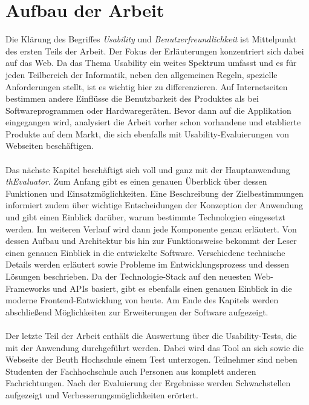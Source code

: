 %
%
%
%

\section{Aufbau der Arbeit}

Die Klärung des Begriffes \textit{Usability} und \textit{Benutzerfreundlichkeit} ist Mittelpunkt des ersten Teils der Arbeit. Der Fokus der Erläuterungen konzentriert sich dabei auf das Web. Da das Thema Usability ein weites Spektrum umfasst und es für jeden Teilbereich der Informatik, neben den allgemeinen Regeln, spezielle Anforderungen stellt, ist es wichtig hier zu differenzieren. Auf Internetseiten bestimmen andere Einflüsse die Benutzbarkeit des Produktes als bei Softwareprogrammen oder Hardwaregeräten. Bevor dann auf die Applikation eingegangen wird, analysiert die Arbeit vorher schon vorhandene und etablierte Produkte auf dem Markt, die sich ebenfalls mit Usability-Evaluierungen von Webseiten beschäftigen.\\
\\
Das nächste Kapitel beschäftigt sich voll und ganz mit der Hauptanwendung \textit{thEvaluator}. Zum Anfang gibt es einen genauen Überblick über dessen Funktionen und Einsatzmöglichkeiten. Eine Beschreibung der Zielbestimmungen informiert zudem über wichtige Entscheidungen der Konzeption der Anwendung und gibt einen Einblick darüber, warum bestimmte Technologien eingesetzt werden. Im weiteren Verlauf wird dann jede Komponente genau erläutert. Von dessen Aufbau und Architektur bis hin zur Funktionsweise bekommt der Leser einen genauen Einblick in die entwickelte Software. Verschiedene technische Details werden erläutert sowie Probleme im Entwicklungsprozess und dessen Lösungen beschrieben. Da der Technologie-Stack auf den neuesten Web-Frameworks und APIs basiert, gibt es ebenfalls einen genauen Einblick in die moderne Frontend-Entwicklung von heute. Am Ende des Kapitels werden abschließend Möglichkeiten zur Erweiterungen der Software aufgezeigt.\\
\\
Der letzte Teil der Arbeit enthält die Auswertung über die Usability-Tests, die mit der Anwendung durchgeführt werden. Dabei wird das Tool an sich sowie die Webseite der Beuth Hochschule einem Test unterzogen. Teilnehmer sind neben Studenten der Fachhochschule auch Personen aus komplett anderen Fachrichtungen. Nach der Evaluierung der Ergebnisse werden Schwachstellen aufgezeigt und Verbesserungsmöglichkeiten erörtert.
